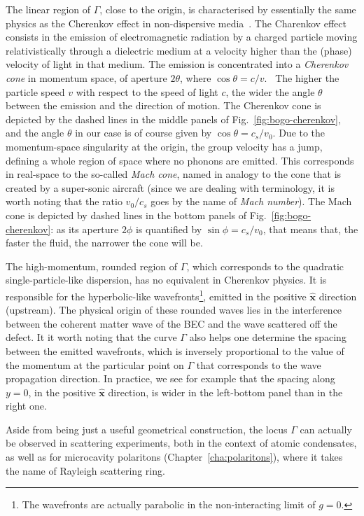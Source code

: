 The linear region of $\Gamma$, close to the origin, is characterised
by essentially the same physics as the Cherenkov effect in
non-dispersive media~\cite{Landau:712712}. The Charenkov effect
consists in the emission of electromagnetic radiation by a charged
particle moving relativistically through a dielectric medium at a
velocity higher than the (phase) velocity of light in that medium. The
emission is concentrated into a \textit{Cherenkov cone} in momentum
space, of aperture $2\theta$, where
$\cos\theta = c/v$.~\cite{jelley1958vcerenkov} The higher the particle
speed $v$ with respect to the speed of light $c$, the wider the angle
$\theta$ between the emission and the direction of motion. The
Cherenkov cone is depicted by the dashed lines in the middle panels of
Fig.~\ref{fig:bogo-cherenkov}, and the angle $\theta$ in our case is
of course given by $\cos\theta = c_s/v_0$. Due to the momentum-space
singularity at the origin, the group velocity has a jump, defining a
whole region of space where no phonons are emitted. This corresponds
in real-space to the so-called \textit{Mach cone}, named in analogy to
the cone that is created by a super-sonic aircraft (since we are
dealing with terminology, it is worth noting that the ratio $v_0/c_s$
goes by the name of \textit{Mach number}). The Mach cone is depicted
by dashed lines in the bottom panels of Fig.~\ref{fig:bogo-cherenkov}:
as its aperture $2\phi$ is quantified by $\sin\phi = c_s/v_0$, that
means that, the faster the fluid, the narrower the cone will be.

The high-momentum, rounded region of $\Gamma$, which corresponds to
the quadratic single-particle-like dispersion, has no equivalent in
Cherenkov physics. It is responsible for the hyperbolic-like
wavefronts\footnote{The wavefronts are actually parabolic in the
  non-interacting limit of $g=0$.}, emitted in the positive
$\hat{\bm{x}}$ direction (upstream). The physical origin of these
rounded waves lies in the interference between the coherent matter
wave of the BEC and the wave scattered off the defect. It it worth
noting that the curve $\Gamma$ also helps one determine the spacing
between the emitted wavefronts, which is inversely proportional to the
value of the momentum at the particular point on $\Gamma$ that
corresponds to the wave propagation direction. In practice, we see for
example that the spacing along $y = 0$, in the positive $\hat{\bm{x}}$
direction, is wider in the left-bottom panel than in the right one.

Aside from being just a useful geometrical construction, the locus
$\Gamma$ can actually be observed in scattering experiments, both in
the context of atomic condensates, as well as for microcavity
polaritons (Chapter~\ref{cha:polaritons}), where it takes
the name of Rayleigh scattering ring.


